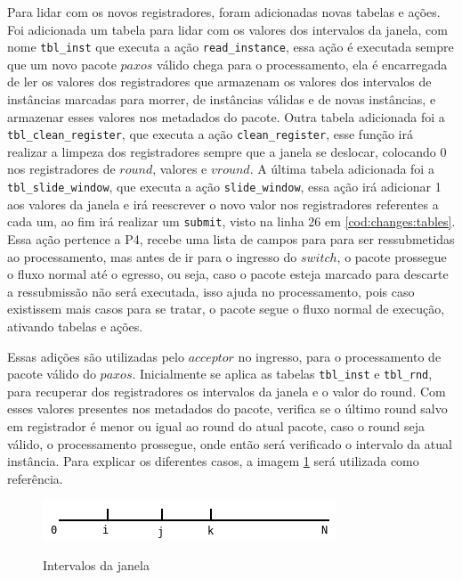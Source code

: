 \documentclass[
    12pt,
    openright, 
    oneside,
    a4paper,
    french,
    english,
    brazil
    ]{facom-ufu-abntex2}
\theoremstyle{definition}
\begin{document}


Para lidar com os novos registradores, foram adicionadas novas tabelas e ações. Foi adicionada um tabela para lidar com os
valores dos intervalos da janela, com nome \texttt{tbl\_inst} que executa a ação \texttt{read\_instance}, essa ação é executada
sempre que um novo pacote $paxos$ válido chega para o processamento, ela é encarregada de ler os valores dos registradores
que armazenam os valores dos intervalos de instâncias marcadas para morrer, de instâncias válidas e de novas instâncias, 
e armazenar esses valores nos metadados do pacote. Outra tabela adicionada foi a \texttt{tbl\_clean\_register}, que executa
a ação \texttt{clean\_register}, esse função irá realizar a limpeza dos registradores sempre que a janela se deslocar, colocando
0 nos registradores de $round$, valores e $vround$. A última tabela adicionada foi a \texttt{tbl\_slide\_window}, que executa a
ação \texttt{slide\_window}, essa ação irá adicionar 1 aos valores da janela e irá reescrever o novo valor nos registradores referentes
a cada um, ao fim irá realizar um \texttt{submit}, visto na linha 26 em \ref{cod:changes:tables}. Essa ação pertence a P4, recebe uma
lista de campos para para ser ressubmetidas ao processamento, mas antes de ir para o ingresso do $switch$, o pacote prossegue o
fluxo normal até o egresso, ou seja, caso o pacote esteja marcado para descarte a ressubmissão não será executada, isso ajuda
no processamento, pois caso existissem mais casos para se tratar, o pacote segue o fluxo normal de execução, ativando
tabelas e ações.

Essas adições são utilizadas pelo $acceptor$ no ingresso, para o processamento de pacote válido do $paxos$. Inicialmente se
aplica as tabelas \texttt{tbl\_inst} e \texttt{tbl\_rnd}, para recuperar dos registradores os intervalos da janela e o valor 
do round. Com esses valores presentes nos metadados do pacote, verifica se o último round salvo em registrador é menor
ou igual ao round do atual pacote, caso o round seja válido, o processamento prossegue, onde então será verificado o intervalo
da atual instância. Para explicar os diferentes casos, a imagem \ref{fig:window-intervals} será utilizada como referência.

\begin{figure}[ht]
    \caption{Intervalos da janela}
    \centering
    \includegraphics[scale=0.8]{images/window.png}
    \label{fig:window-intervals}
\end{figure}
\end{document}
